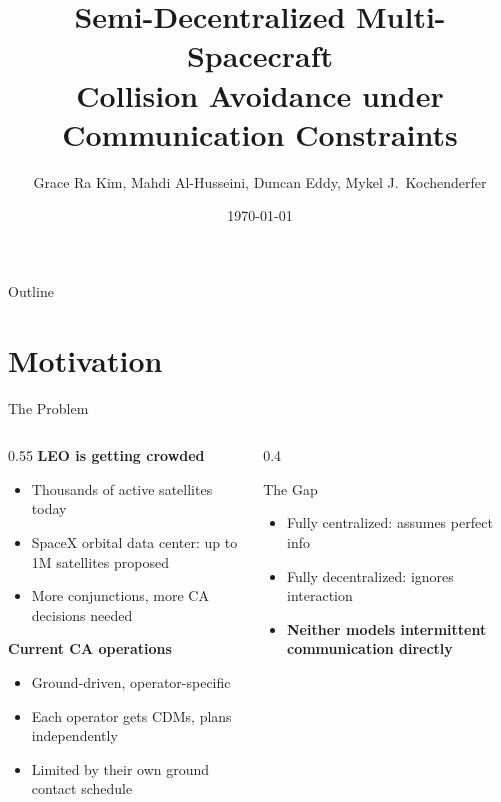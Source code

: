 \documentclass[aspectratio=169]{beamer}
\title[Spacecraft CA SDec-POMDP]{Semi-Decentralized Multi-Spacecraft\\
Collision Avoidance under Communication Constraints}
\author{Grace Ra Kim, Mahdi Al-Husseini, Duncan Eddy, Mykel J.\ Kochenderfer}
\institute{Stanford University}
\date{\today}
\begin{document}

\begin{frame}
  \titlepage
\end{frame}

\begin{frame}{Outline}
  \tableofcontents
\end{frame}

\section{Motivation}

\begin{frame}{The Problem}
  \begin{columns}
    \begin{column}{0.55\textwidth}
      \textbf{LEO is getting crowded}
      \begin{itemize}
        \item Thousands of active satellites today
        \item SpaceX orbital data center: up to 1M satellites proposed
        \item More conjunctions, more CA decisions needed
      \end{itemize}
      \vspace{1em}
      \textbf{Current CA operations}
      \begin{itemize}
        \item Ground-driven, operator-specific
        \item Each operator gets CDMs, plans independently
        \item Limited by their own ground contact schedule
      \end{itemize}
    \end{column}
    \begin{column}{0.4\textwidth}
      \begin{block}{The Gap}
        \begin{itemize}
          \item Fully centralized: assumes perfect info
          \item Fully decentralized: ignores interaction
          \item \textbf{Neither models intermittent communication directly}
        \end{itemize}
      \end{block}
    \end{column}
  \end{columns}
\end{frame}
\end{document}
